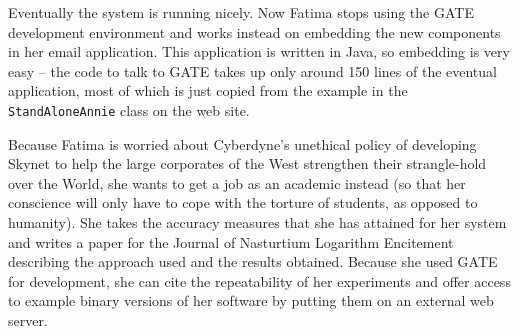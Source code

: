 Eventually the system is running nicely.
Now Fatima stops using the GATE development
environment and works instead on embedding the new components in her email
application. This application is written in Java, so embedding is very
easy -- the
code to talk to GATE takes up only around 150 lines of the eventual
application, most of which is just copied from the example in the
{\tt StandAloneAnnie} class on the web site.

Because Fatima is worried about Cyberdyne's unethical policy of developing
Skynet to help the large corporates of the West strengthen their
strangle-hold over the World, she wants to get a job as an academic instead
(so that her conscience will only have to cope with the torture of students,
as opposed to humanity). She takes the accuracy measures that she has
attained for her system and writes a paper for the Journal of Nasturtium
Logarithm Encitement describing the approach used and the results obtained.
Because she used GATE for development, she can cite the repeatability of her
experiments and offer access to example binary versions of her software by 
putting them on an external web server.
